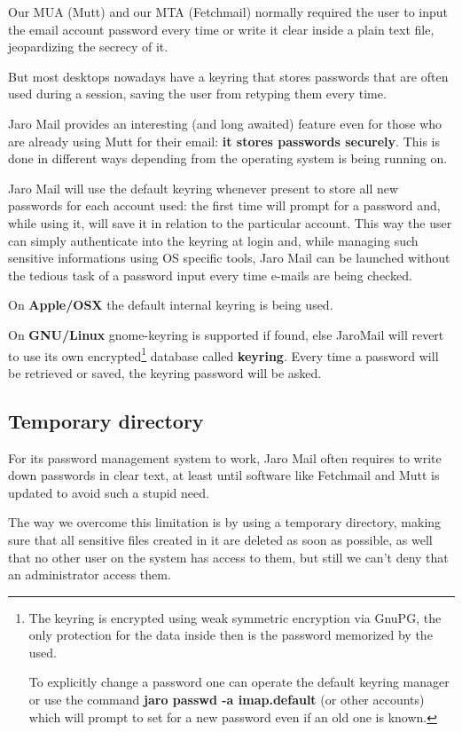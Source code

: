 \documentclass[a4,onecolumn,portrait]{article}
\begin{document}
Our MUA (Mutt) and our MTA (Fetchmail) normally required the user to
input the email account password every time or write it clear inside a
plain text file, jeopardizing the secrecy of it.

But most desktops nowadays have a keyring that stores passwords that
are often used during a session, saving the user from retyping them
every time.

Jaro Mail provides an interesting (and long awaited) feature even for
those who are already using Mutt for their email: \textbf{it stores passwords
securely}. This is done in different ways depending from the operating
system is being running on.

Jaro Mail will use the default keyring whenever present to store all
new passwords for each account used: the first time will prompt for a
password and, while using it, will save it in relation to the
particular account. This way the user can simply authenticate into the
keyring at login and, while managing such sensitive informations using
OS specific tools, Jaro Mail can be launched without the tedious task
of a password input every time e-mails are being checked.

On \textbf{Apple/OSX} the default internal keyring is being used.

On \textbf{GNU/Linux} gnome-keyring is supported if found, else JaroMail will
revert to use its own encrypted\footnote{The keyring is encrypted using weak symmetric
encryption via GnuPG, the only protection for the data inside then is
the password memorized by the used.

To explicitly change a password one can operate the default keyring
manager or use the command \textbf{jaro passwd -a imap.default} (or other
accounts) which will prompt to set for a new password even if an old
one is known.} database called \textbf{keyring}. Every time
a password will be retrieved or saved, the keyring password will be
asked.
\subsection{Temporary directory}
\label{sec-8-2}

For its password management system to work, Jaro Mail often requires
to write down passwords in clear text, at least until software like
Fetchmail and Mutt is updated to avoid such a stupid need.

The way we overcome this limitation is by using a temporary directory,
making sure that all sensitive files created in it are deleted as soon
as possible, as well that no other user on the system has access to
them, but still we can't deny that an administrator access them.
\end{document}
